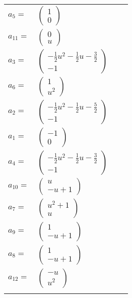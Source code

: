 \documentclass[1p]{elsarticle_modified}
\theoremstyle{definition}
\begin{document}
\begin{tabular}{m{7pt} m{180pt} m{7pt} m{180pt} }
\flushright $a_{5}=$&$\begin{pmatrix}1\\0\end{pmatrix}$ \\
\flushright $a_{11}=$&$\begin{pmatrix}0\\u\end{pmatrix}$ \\
\flushright $a_{3}=$&$\begin{pmatrix}-\frac{1}{2} u^2-\frac{1}{2} u-\frac{3}{2}\\-1\end{pmatrix}$ \\
\flushright $a_{6}=$&$\begin{pmatrix}1\\u^2\end{pmatrix}$ \\
\flushright $a_{2}=$&$\begin{pmatrix}-\frac{1}{2} u^2-\frac{1}{2} u-\frac{5}{2}\\-1\end{pmatrix}$ \\
\flushright $a_{1}=$&$\begin{pmatrix}-1\\0\end{pmatrix}$ \\
\flushright $a_{4}=$&$\begin{pmatrix}-\frac{1}{2} u^2-\frac{1}{2} u-\frac{3}{2}\\-1\end{pmatrix}$ \\
\flushright $a_{10}=$&$\begin{pmatrix}u\\- u+1\end{pmatrix}$ \\
\flushright $a_{7}=$&$\begin{pmatrix}u^2+1\\u\end{pmatrix}$ \\
\flushright $a_{9}=$&$\begin{pmatrix}1\\- u+1\end{pmatrix}$ \\
\flushright $a_{8}=$&$\begin{pmatrix}1\\- u+1\end{pmatrix}$ \\
\flushright $a_{12}=$&$\begin{pmatrix}- u\\u^2\end{pmatrix}$\\&\end{tabular}
\end{document}
